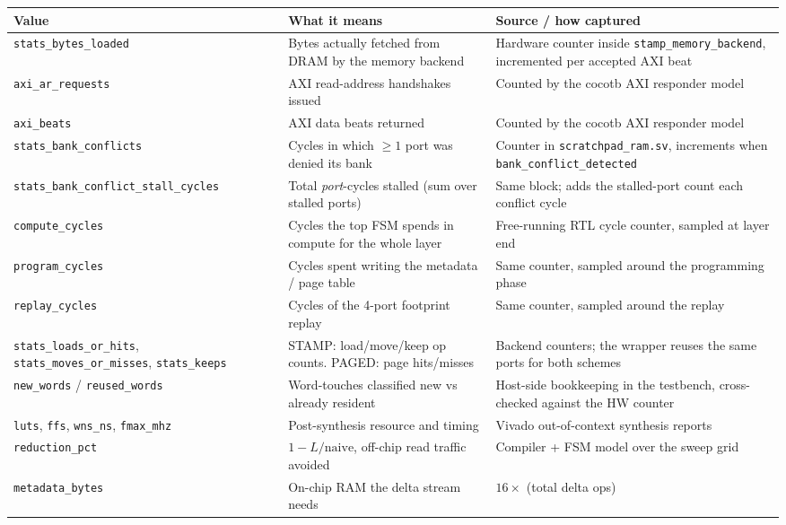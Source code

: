 \documentclass[11pt,a4paper]{article}
\newcommand{\file}[1]{\texttt{\small #1}}
\begin{document}
\begin{center}
\small
\begin{longtable}{@{}p{4.3cm}p{5.0cm}p{6.2cm}@{}}
\toprule
\textbf{Value} & \textbf{What it means} & \textbf{Source / how captured} \\
\midrule
\endhead
\file{stats\_bytes\_loaded} & Bytes actually fetched from DRAM by the memory backend & Hardware counter inside \file{stamp\_memory\_backend}, incremented per accepted AXI beat \\
\file{axi\_ar\_requests} & AXI read-address handshakes issued & Counted by the cocotb AXI responder model \\
\file{axi\_beats} & AXI data beats returned & Counted by the cocotb AXI responder model \\
\file{stats\_bank\_conflicts} & Cycles in which $\ge 1$ port was denied its bank & Counter in \file{scratchpad\_ram.sv}, increments when \file{bank\_conflict\_detected} \\
\file{stats\_bank\_conflict\_stall\_cycles} & Total \emph{port}-cycles stalled (sum over stalled ports) & Same block; adds the stalled-port count each conflict cycle \\
\file{compute\_cycles} & Cycles the top FSM spends in compute for the whole layer & Free-running RTL cycle counter, sampled at layer end \\
\file{program\_cycles} & Cycles spent writing the metadata / page table & Same counter, sampled around the programming phase \\
\file{replay\_cycles} & Cycles of the 4-port footprint replay & Same counter, sampled around the replay \\
\file{stats\_loads\_or\_hits}, \file{stats\_moves\_or\_misses}, \file{stats\_keeps} & STAMP: load/move/keep op counts. PAGED: page hits/misses & Backend counters; the wrapper reuses the same ports for both schemes \\
\file{new\_words} / \file{reused\_words} & Word-touches classified new vs already resident & Host-side bookkeeping in the testbench, cross-checked against the HW counter \\
\file{luts}, \file{ffs}, \file{wns\_ns}, \file{fmax\_mhz} & Post-synthesis resource and timing & Vivado out-of-context synthesis reports \\
\file{reduction\_pct} & $1 - L/\text{naive}$, off-chip read traffic avoided & Compiler + FSM model over the sweep grid \\
\file{metadata\_bytes} & On-chip RAM the delta stream needs & $16 \times$ (total delta ops) \\
\bottomrule
\end{longtable}
\end{center}
\end{document}
